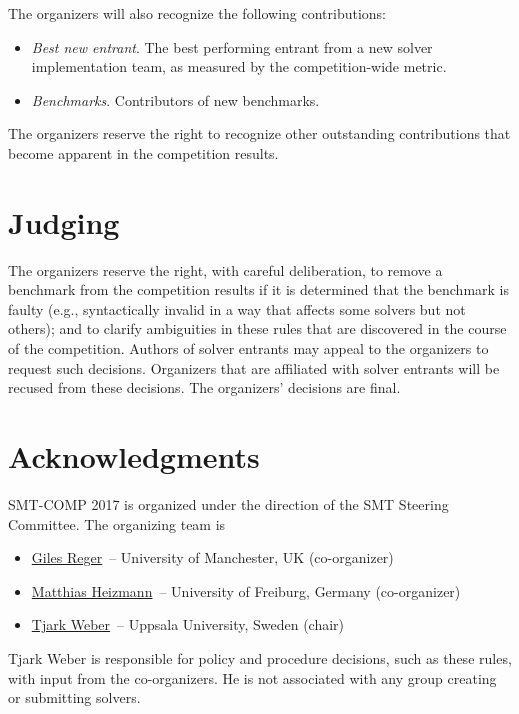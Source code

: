 \documentclass[12pt]{article}
\begin{document}
The organizers will also recognize the following contributions:
%
\begin{itemize}
\item \emph{Best new entrant}. The best performing entrant from a new
  solver implementation team, as measured by the competition-wide
  metric.
\item \emph{Benchmarks}. Contributors of new benchmarks.
\end{itemize}
%
The organizers reserve the right to recognize other outstanding
contributions that become apparent in the competition results.


\section{Judging}

The organizers reserve the right, with careful deliberation, to remove
a benchmark from the competition results if it is determined that the
benchmark is faulty (e.g., syntactically invalid in a way that affects
some solvers but not others); and to clarify ambiguities in these
rules that are discovered in the course of the competition.  Authors
of solver entrants may appeal to the organizers to request such
decisions.  Organizers that are affiliated with solver entrants will
be recused from these decisions.  The organizers' decisions are final.


\section{Acknowledgments}

SMT-COMP 2017 is organized under the direction of the SMT Steering
Committee. The organizing team is
%
\begin{itemize}
\setlength{\itemsep}{0pt}
\item \href{http://www.cs.man.ac.uk/~regerg/}{Giles Reger}~--
  University of Manchester, UK (co-organizer)
\item
  \href{https://swt.informatik.uni-freiburg.de/staff/heizmann}{Matthias
    Heizmann}~-- University of Freiburg, Germany (co-organizer)
\item \href{http://user.it.uu.se/~tjawe125/}{Tjark Weber}~-- Uppsala
  University, Sweden (chair)
\end{itemize}
%
Tjark Weber is responsible for policy and procedure decisions, such as
these rules, with input from the co-organizers. He is not associated
with any group creating or submitting solvers.
\end{document}
